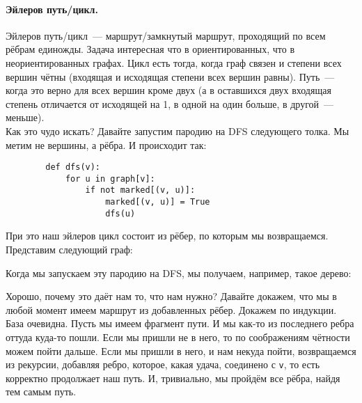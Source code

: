 \documentclass{article}
\begin{document}
    \paragraph{Эйлеров путь/цикл.}
    Эйлеров путь/цикл~--- маршрут/замкнутый маршрут, проходящий по всем рёбрам единожды. Задача интересная что в ориентированных, что в неориентированных графах. Цикл есть тогда, когда граф связен и степени всех вершин чётны (входящая и исходящая степени всех вершин равны). Путь~--- когда это верно для всех вершин кроме двух (а в оставшихся двух входящая степень отличается от исходящей на 1, в одной на один больше, в другой~--- меньше).\\
    Как это чудо искать? Давайте запустим пародию на DFS следующего толка. Мы метим не вершины, а рёбра. И происходит так:
    \begin{verbatim}
        def dfs(v):
            for u in graph[v]:
                if not marked[(v, u)]:
                    marked[(v, u)] = True
                    dfs(u)
    \end{verbatim}
    При это наш эйлеров цикл состоит из рёбер, по которым мы возвращаемся. Представим следующий граф:
    \begin{figure}[H]
    \end{figure}\noindent
    Когда мы запускаем эту пародию на DFS, мы получаем, например, такое дерево:
    \begin{figure}[H]
    \end{figure}\noindent
    Хорошо, почему это даёт нам то, что нам нужно? Давайте докажем, что мы в любой момент имеем маршрут из добавленных рёбер. Докажем по индукции. База очевидна. Пусть мы имеем фрагмент пути. И мы как-то из последнего ребра оттуда куда-то пошли. Если мы пришли не в него, то по соображениям чётности можем пойти дальше. Если мы пришли в него, и нам некуда пойти, возвращаемся из рекурсии, добавляя ребро, которое, какая удача, соединено с \texttt{v}, то есть корректно продолжает наш путь. И, тривиально, мы пройдём все рёбра, найдя тем самым путь.
    
\end{document}
